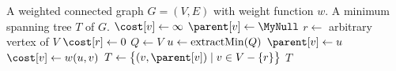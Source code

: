 
\begin{algorithmic}[1]
\Require A weighted connected graph $G = (V,E)$ with weight function $w$.
\Ensure A minimum spanning tree $T$ of $G$.
  \State $\cost[v] \gets \infty$
  \State $\parent[v] \gets \MyNull$\label{alg:prim:for_end:init}
\EndFor
\State $r \gets$ arbitrary vertex of $V$\label{alg:prim:arbitrary_root}
\State $\cost[r] \gets 0$
\State $Q \gets V$\label{alg:prim:init_min_priority_queue}
  \State $u \gets \operatorname*{extractMin}(Q)$\label{alg:prim:extract_min}
      \State $\parent[v] \gets u$
      \State $\cost[v] \gets w(u,v)$\label{alg:prim:while_end:build_tree}
    \EndIf
  \EndFor
\EndWhile
\State $T \gets \big\{(v, \parent[v]) \mid v \in V - \{r\}\big\}$\label{alg:prim:MST_edge_set}
\State \Return $T$\label{alg:prim:return_MST}
\end{algorithmic}
